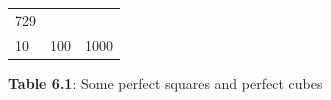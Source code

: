 {{\begin{center}
\begin{xtabular}[t]{|l|l|l|}
        729%
     \tabularnewline{}
        10 &
        100 &
        1000%
     \tabularnewline{}
    \end{xtabular}
      \end{center}
    \begin{center}{\small\bfseries Table 6.1}: Some perfect squares and perfect cubes\end{center}
          } %
        }{%
        }
